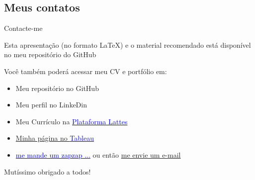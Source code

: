 \documentclass{beamer}
\begin{document}
\subsection{Meus contatos}
\begin{frame}{Contacte-me}

\begin{center}
Esta apresentação (no formato \LaTeX{}) e o material recomendado está disponível no meu repositório do GitHub
 \href{https://github.com/rhozon/Banca-FAE}{\faGithub}
\end{center}


Você também poderá acessar meu CV e portfólio em:
\begin{center}
\vspace{.25cm}
\vspace{.25cm}
\end{center}

\begin{itemize}
    \item Meu repositório no GitHub \href{https://github.com/rhozon}{\faGithub}
    \item Meu perfil no LinkeDin \href{https://www.linkedin.com/in/rodrigohermontozon/}{\faLinkedin}
    \item Meu Currículo na \href{http://lattes.cnpq.br/3532649625879285}{\textcolor{blue}{Plataforma Lattes}}
    \item \href{https://public.tableau.com/profile/rodrigoozon#!/}{Minha página no \textcolor{blue}{Tableau}}
    \item \href{https://api.whatsapp.com/send?phone=5541988382904&text=Ol\%C3\%A1\%20prof.\%20Rodrigo\%2C\%20participei\%20de\%20sua\%20banca\%20na\%20FAE...}{\textcolor{blue}{me mande um zapzap ...}}
    \subitem ou então \textcolor{blue}{\href{mailto:rodrigoozon@yahoo.com.br}{me envie um e-mail}}
\end{itemize}

\vspace{.025cm}
\begin{center}
    Mutíssimo obrigado a todos! \faSmileO
\end{center}
\end{frame}

\end{document}
